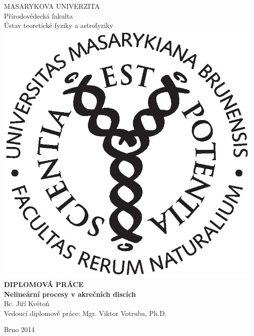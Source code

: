 \documentclass[12pt,notitlepage]{report}
\begin{document}
%
%
\begin{titlepage}
\begin{center}


{\Large MASARYKOVA UNIVERZITA}\\
\vspace{3mm}
{Přírodovědecká fakulta}\\
{Ústav teoretické fyziky a astrofyziky}\\
\vspace{10mm}
\includegraphics[scale=0.4]{logo.eps}\\
\vspace{10mm}
{\Large\bf DIPLOMOVÁ PRÁCE}\\
\vspace{3mm}
{\bf Nelineární procesy v akrečních discích}\\
\vspace{20mm}
{\Large Bc. Jiří Květoň}\\
\vspace{30mm}
\large
\noindent Vedoucí diplomové práce: Mgr. Viktor Votruba, Ph.D.

\vspace{20mm}

Brno 2014
\end{center}

\end{titlepage}
\end{document}

